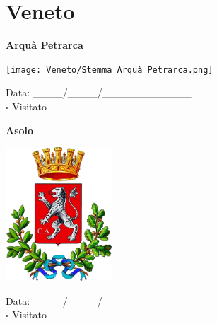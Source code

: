 \documentclass[a5paper,12pt]{article}
\begin{document}
\newpage 

\section*{Veneto}

\newpage

\noindent
\begin{minipage}[t]{0.45\textwidth}
    \begin{center}
        \textbf{Arquà Petrarca}
    \end{center}
    \vspace{-0.5cm} %
    \begin{center}
        \texttt{[image: Veneto/Stemma Arquà Petrarca.png]}
    \end{center}
    \vspace{-0.4cm} %
    \begin{flushleft}
        Data: \_\_\_\_/\_\_\_\_/\_\_\_\_\_\_\_\_\_\_\_\_ \\
        $\square$ Visitato
    \end{flushleft}
\end{minipage}
\hfill
\noindent
\begin{minipage}[t]{0.45\textwidth}
    \begin{center}
        \textbf{Asolo}
    \end{center}
    \vspace{-0.5cm} %
    \begin{center}
        \includegraphics[height= 5cm, width=4cm]{Veneto/Stemma Asolo.png}
    \end{center}
    \vspace{-0.4cm} %
    \begin{flushleft}
        Data: \_\_\_\_/\_\_\_\_/\_\_\_\_\_\_\_\_\_\_\_\_ \\
        $\square$ Visitato
    \end{flushleft}
\end{minipage}
\end{document}
